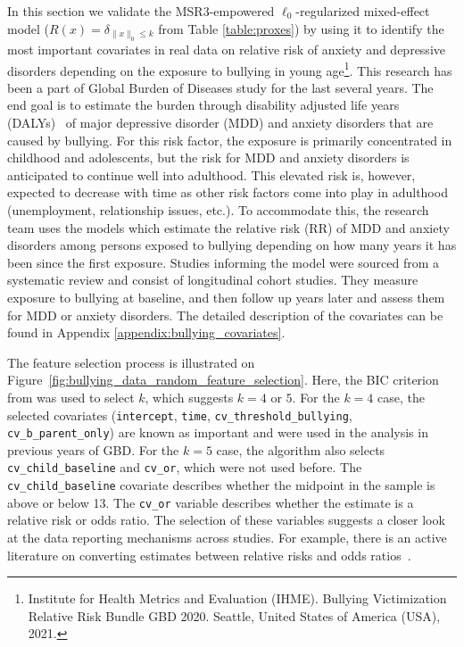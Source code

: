 In this section we validate the MSR3-empowered $\ell_0$-regularized mixed-effect model ($R(x) = \delta_{\|x\|_0 \leq k}$ from Table \ref{table:proxes}) by using it to identify the most important covariates in real data on relative risk of anxiety and depressive disorders depending on the exposure to bullying in young age\footnote{Institute for Health Metrics and Evaluation (IHME). Bullying Victimization Relative Risk Bundle GBD 2020. Seattle, United States of America (USA), 2021.}. This research has been a part of Global Burden of Diseases study for the last several years. The end goal  is to estimate the burden 
{through disability adjusted life years} (DALYs)~\citep{murray1997understanding}
of major depressive disorder (MDD) and anxiety disorders that are caused by bullying. For this risk factor, the exposure is primarily concentrated in childhood and adolescents, but the risk for MDD and anxiety disorders is anticipated to continue well into adulthood. This elevated risk is, however, expected to decrease with time as other risk factors come into play in adulthood (unemployment, relationship issues, etc.). To accommodate this, the research team uses the models which estimate the relative risk (RR) of MDD and anxiety disorders among persons exposed to bullying depending on how many years it has been since the first exposure. Studies informing the model were sourced from a systematic review and consist of longitudinal cohort studies. They measure exposure to bullying at baseline, and then follow up years later and assess them for MDD or anxiety disorders. The detailed description of the covariates can be found in Appendix \ref{appendix:bullying_covariates}.

The feature selection process is illustrated on Figure~\ref{fig:bullying_data_random_feature_selection}. 
Here, the BIC criterion from \cite{Jones2011} was used to select $k$, which suggests $k=4$ or $5$.  
 For the $k=4$ case, the selected covariates (\texttt{intercept}, \texttt{time}, \texttt{cv\_threshold\_bullying}, \texttt{cv\_b\_parent\_only}) 
are known as important and were used in the analysis in previous years of GBD. For the $k=5$ case, 
the algorithm also selects  \texttt{cv\_child\_baseline} and \texttt{cv\_or}, which were not used before. The  \texttt{cv\_child\_baseline} covariate describes whether the midpoint in the sample is above or below 13. 
The  \texttt{cv\_or} variable describes whether the estimate is a relative risk or odds ratio. The selection of these variables suggests a closer look at the data reporting mechanisms across studies. 
For example, there is an active literature on converting estimates between relative risks and odds ratios~\cite{grant2014converting,wang2013converting}.


